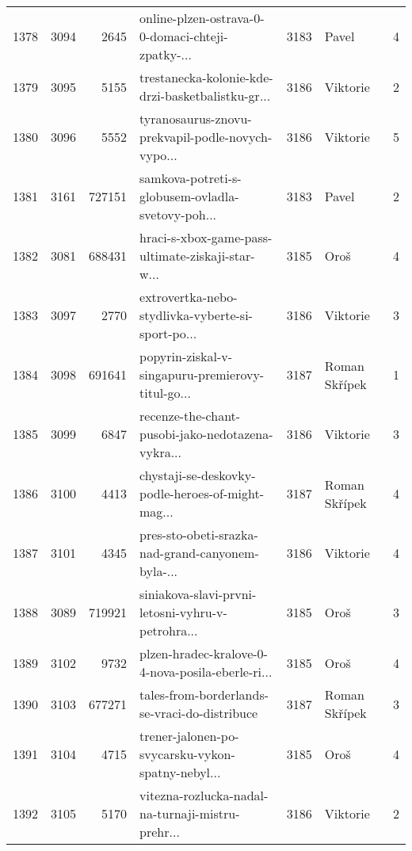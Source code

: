 \begin{tabular}{lrrlrlr}
1378 &       3094 &     2645 &  online-plzen-ostrava-0-0-domaci-chteji-zpatky-... &     3183 &                        Pavel &               4 \\
1379 &       3095 &     5155 &  trestanecka-kolonie-kde-drzi-basketbalistku-gr... &     3186 &                     Viktorie &               2 \\
1380 &       3096 &     5552 &  tyranosaurus-znovu-prekvapil-podle-novych-vypo... &     3186 &                     Viktorie &               5 \\
1381 &       3161 &   727151 &  samkova-potreti-s-globusem-ovladla-svetovy-poh... &     3183 &                        Pavel &               2 \\
1382 &       3081 &   688431 &  hraci-s-xbox-game-pass-ultimate-ziskaji-star-w... &     3185 &                         Oroš &               4 \\
1383 &       3097 &     2770 &  extrovertka-nebo-stydlivka-vyberte-si-sport-po... &     3186 &                     Viktorie &               3 \\
1384 &       3098 &   691641 &  popyrin-ziskal-v-singapuru-premierovy-titul-go... &     3187 &                Roman Skřípek &               1 \\
1385 &       3099 &     6847 &  recenze-the-chant-pusobi-jako-nedotazena-vykra... &     3186 &                     Viktorie &               3 \\
1386 &       3100 &     4413 &  chystaji-se-deskovky-podle-heroes-of-might-mag... &     3187 &                Roman Skřípek &               4 \\
1387 &       3101 &     4345 &  pres-sto-obeti-srazka-nad-grand-canyonem-byla-... &     3186 &                     Viktorie &               4 \\
1388 &       3089 &   719921 &  siniakova-slavi-prvni-letosni-vyhru-v-petrohra... &     3185 &                         Oroš &               3 \\
1389 &       3102 &     9732 &  plzen-hradec-kralove-0-4-nova-posila-eberle-ri... &     3185 &                         Oroš &               4 \\
1390 &       3103 &   677271 &      tales-from-borderlands-se-vraci-do-distribuce &     3187 &                Roman Skřípek &               3 \\
1391 &       3104 &     4715 &  trener-jalonen-po-svycarsku-vykon-spatny-nebyl... &     3185 &                         Oroš &               4 \\
1392 &       3105 &     5170 &  vitezna-rozlucka-nadal-na-turnaji-mistru-prehr... &     3186 &                     Viktorie &               2 \\

\end{tabular}

